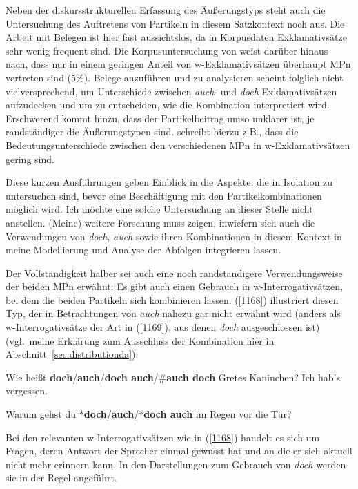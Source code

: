 Neben der diskursstrukturellen Erfassung des Äußerungstyps steht auch die Untersuchung des Auftretens von Partikeln in diesem Satzkontext noch aus. Die Arbeit mit Belegen ist hier fast aussichtslos, da in Korpusdaten Exklamativsätze sehr wenig frequent sind. Die Korpusuntersuchung von \citet{Naef1996} weist darüber hinaus nach, dass nur in einem geringen Anteil von w-Exklamativsätzen  überhaupt MPn vertreten sind (5\%). Belege anzuführen und zu analysieren scheint folg\-lich nicht vielversprechend, um Unterschiede zwischen \textit{auch}- und \textit{doch}-Ex\-kla\-ma\-tiv\-sät\-zen aufzudecken und um zu entscheiden, wie die Kombination interpretiert wird. Erschwerend kommt hinzu, dass der Partikelbeitrag umso unklarer ist, je randständiger die Äußerungstypen sind. \citet[637]{Thurmair2013} schreibt hierzu z.B., dass die Bedeutungsunterschiede zwischen den verschiedenen MPn in w-Exklamativsätzen gering sind. 

Diese kurzen Ausführungen geben Einblick in die Aspekte, die in Isolation zu untersuchen sind, bevor eine Beschäftigung mit den Partikelkombinationen möglich wird. Ich möchte eine solche Untersuchung an dieser Stelle nicht anstellen. (Meine) weitere Forschung muss zeigen, inwiefern sich auch die Verwendungen von \textit{doch}, \textit{auch} sowie ihren Kombinationen in diesem Kontext in meine Modellierung und Analyse der Abfolgen integrieren lassen.

Der Vollständigkeit halber sei auch eine noch randständigere Verwendungsweise der beiden MPn erwähnt: Es gibt auch einen Gebrauch in w-In\-ter\-ro\-ga\-tiv\-sät\-zen,  bei dem die beiden Partikeln sich kombinieren lassen. (\ref{1168}) illustriert diesen Typ, der in Betrachtungen von \textit{auch} nahezu gar nicht erwähnt wird (anders als w-Interrogativsätze der Art in (\ref{1169}), aus denen \textit{doch} ausgeschlossen ist) (vgl.\ meine Erklärung zum Ausschluss der Kombination hier in Abschnitt~\ref{sec:distributionda}).

\begin{exe}
	\ex\label{1168} 
	Wie heißt \textbf{doch}/\textbf{auch}/\textbf{doch auch}/\#\textbf{auch doch} Gretes Kaninchen? Ich hab's vergessen.
\end{exe}

\begin{exe}
	\ex\label{1169} 
	Warum gehst du *\textbf{doch}/\textbf{auch}/*\textbf{doch auch} im Regen vor die Tür?
\end{exe}	
Bei den relevanten w-Interrogativsätzen wie in (\ref{1168}) handelt es sich um Fragen, deren Antwort der Sprecher einmal gewusst hat und an die er sich aktuell nicht mehr erinnern kann. In den Darstellungen zum Gebrauch von \textit{doch} werden sie in der Regel angeführt.

